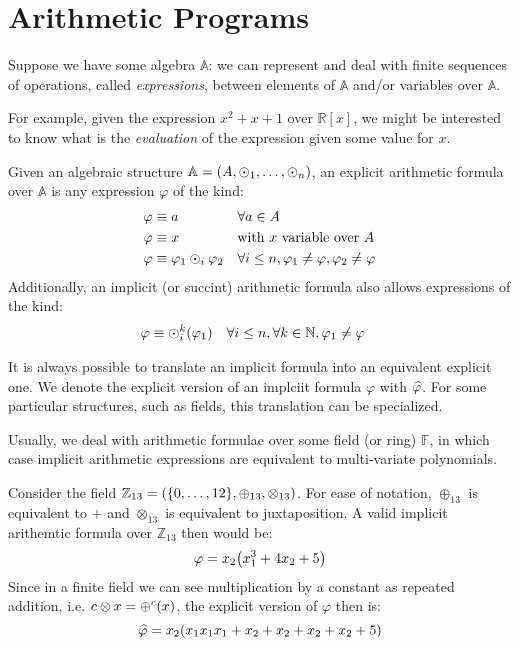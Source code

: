 \section{Arithmetic Programs}
Suppose we have some algebra \(\mathbb{A}\): we can represent and deal with finite sequences of 
operations, called \emph{expressions}, between elements of \(\mathbb{A}\) and/or variables over 
\(\mathbb{A}\).

For example, given the expression \(x^2 + x + 1\) over \(\mathbb{R}\left[x\right]\), we might be 
interested to know what is the \emph{evaluation} of the expression given some value for \(x\).

\begin{definition}
  Given an algebraic structure \(\mathbb{A} = \left(A, \odot_1, \dots, \odot_n\right)\), an explicit 
  arithmetic formula over \(\mathbb{A}\) is any expression \(\varphi \) of the kind:
  \begin{align*}
    & \varphi \equiv a && \forall a \in A \\ 
    & \varphi \equiv x && \textnormal{with \(x\) variable over \(A\)} \\
    & \varphi \equiv \varphi_1 \odot_i \varphi_2 && 
    \forall i \le n, \varphi_1 \neq \varphi, \varphi_2 \neq \varphi
  \end{align*}
  Additionally, an implicit (or succint) arithmetic formula also allows expressions of the kind:
  \begin{align*}
    & \varphi \equiv \call{\odot_i^k}{\varphi_1} && 
    \forall i \le n, \forall k \in \mathbb{N}, \varphi_1 \neq \varphi
  \end{align*}
\end{definition}

\begin{remark}
  It is always possible to translate an implicit formula into an equivalent explicit one.
  We denote the explicit version of an implciit formula \(\varphi \) with \(\widehat{\varphi}\).
  For some particular structures, such as fields, this translation can be specialized. 
\end{remark}

Usually, we deal with arithmetic formulae over some field (or ring) \(\mathbb{F}\), in which case 
implicit arithmetic expressions are equivalent to multi-variate polynomials.
\begin{example}\label{ex:arithmetic_formula}
  Consider the field \(\mathbb{Z}_{13} = \Tuple{\Set{0, \dots, 12}, \oplus_{13}, \otimes_{13}}\).
  For ease of notation, \(\oplus_{13}\) is equivalent to \(+\) and \(\otimes_{13}\) is equivalent 
  to juxtaposition. 
  A valid implicit arithemtic formula over \(\mathbb{Z}_{13}\) then would be:
  \[\varphi = x_{2}\Parens*{x_{1}^{3} + 4x_{2} + 5}\]
  Since in a finite field we can see multiplication by a constant as repeated addition, i.e. 
  \(c \otimes x = \call{\oplus^{c}}{x}\), the explicit version of \(\varphi \) then is:
  \[\explicit{\varphi} = x_{2}\Parens*{x_{1}x_{1}x_{1} + x_{2} + x_{2} + x_{2} + x_{2} + 5}\]
\end{example} 

